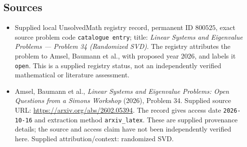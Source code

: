 \documentclass[11pt]{article}
\begin{document}
\subsection{Sources}
\begin{itemize}
\item Supplied local UnsolvedMath registry record, permanent ID \(800525\), exact source problem code \texttt{catalogue entry}; title: \emph{Linear Systems and Eigenvalue Problems --- Problem 34 (Randomized SVD)}. The registry attributes the problem to Amsel, Baumann et al., with proposed year 2026, and labels it \texttt{open}. This is a supplied registry status, not an independently verified mathematical or literature assessment.
\item Amsel, Baumann et al., \emph{Linear Systems and Eigenvalue Problems: Open Questions from a Simons Workshop} (2026), Problem 34. Supplied source URL: \url{https://arxiv.org/abs/2602.05394}. The record gives access date \texttt{2026-10-16} and extraction method \texttt{arxiv\_latex}. These are supplied provenance details; the source and access claim have not been independently verified here. Supplied attribution/context: randomized SVD.
\end{itemize}
\end{document}
